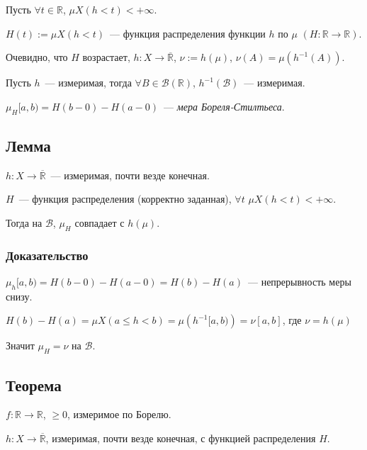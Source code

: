 \documentclass{article}
\begin{document}
            Пусть $\forall t \in \mathbb{R}$, $\mu X(h < t) < +\infty$.
    
            $H(t) := \mu X(h < t)$~--- функция распределения функции $h$ по $\mu$ $(H : \mathbb{R} \rightarrow \mathbb{R})$.
    
            Очевидно, что $H$ возрастает, $h : X \rightarrow \overline{\mathbb{R}}$, $\nu := h(\mu)$, $\nu(A) = \mu \left( h^{-1}(A) \right)$.
    
            Пусть $h$~--- измеримая, тогда $\forall B \in \mathcal{B} \left( \mathbb{R} \right)$, $h^{-1} \left( \mathcal{B} \right)$~--- измеримая.
    
            $\mu_H[a, b) = H(b - 0) - H(a - 0)$~--- \textit{мера Бореля-Стилтьеса}.
    
        \subsection{Лемма}
    
            $h : X \rightarrow \overline{\mathbb{R}}$~--- измеримая, почти везде конечная.
        
            $H$~--- функция распределения (корректно заданная), $\forall t$ $\mu X(h < t) < +\infty$.
        
            Тогда на $\mathcal{B}$, $\mu_H$ совпадает с $h(\mu)$.
        
        \subsubsection{Доказательство}
        
            $\mu_h[a, b) = H(b - 0) - H(a - 0) = H(b) - H(a)$~--- непрерывность меры снизу.
            
            $H(b) - H(a) = \mu X(a \leqslant h < b) = \mu \left( h^{-1} [a, b) \right) = \nu [a, b]$, где $\nu = h(\mu)$
            
            Значит $\mu_H = \nu$ на $\mathcal{B}$.
            
        \subsection{Теорема}
    
            $f : \mathbb{R} \rightarrow \mathbb{R}$, $\geqslant 0$, измеримое по Борелю.
        
            $h : X \rightarrow \overline{\mathbb{R}}$, измеримая, почти везде конечная, с функцией распределения $H$.
        
\end{document}
